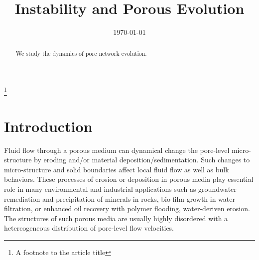 \documentclass[%
 reprint,
 amsmath,amssymb,
 aps,
]{revtex4-1}
\begin{document}

\title{Instability and Porous Evolution}%
\thanks{A footnote to the article title}%



\date{\today}%

\begin{abstract}
We study the dynamics of pore network evolution.


\end{abstract}

\maketitle

\section{Introduction}
%
Fluid flow through a porous medium can dynamical change the pore-level micro-structure by eroding and/or material deposition/sedimentation. Such  changes to micro-structure and solid boundaries affect local fluid flow as well as bulk behaviors. These processes of erosion or deposition in porous media play essential role in many environmental and industrial applications such as groundwater remediation and precipitation of minerals in rocks, bio-film growth in water filtration, or enhanced oil recovery with polymer flooding, water-deriven erosion. The structures of such porous media are usually highly disordered with a hetereogeneous distribution of pore-level flow velocities.
\end{document}
